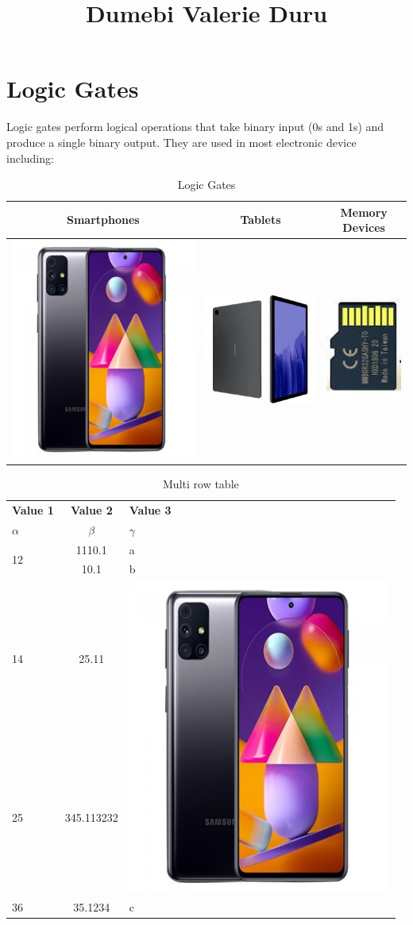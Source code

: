 \documentclass{article}
\begin{document}
		\title{Dumebi Valerie Duru}
		\maketitle
	\section{Logic Gates}
			Logic gates perform logical operations that take binary input (0s and 1s) and produce a single binary output. They are used in most electronic device including:
			\cite{hall2019opportunity}

	\begin{table}[h!]
		\begin{center}
			\caption{Logic Gates}
			\label{tab: table 1}
			\begin{tabular}{|c|c|c|}
					\hline
					Smartphones & Tablets & Memory Devices\\
					\hline
					\includegraphics[width=0.1\linewidth]{phone.jpg} & \includegraphics[width=0.1\linewidth]{tablet.jpg} & \includegraphics[width=0.1\linewidth]{memory device.jpg}\\
					\hline
			\end{tabular}
		\end{center}	
	\end{table}

	\begin{table}[h!]
		\caption{Multi row table}
		\label{tab: table 2}
		\begin{center}
		\begin{tabular}{|l|c|l|}
			\hline
			\textbf{Value 1} & \textbf{Value 2} & \textbf{Value 3}\\
			$\alpha$ & $\beta$ & $\gamma$\\ 
			\hline
			\multirow{2}{*}{12} & 1110.1 & a\\
			& 10.1 & b\\
			\hline
			14 & 25.11 & \multirow{2}{*}{\includegraphics[width=0.05\linewidth]{phone.jpg}}\\
			25 & 345.113232 & \\
			\hline
			36 & 35.1234 & c\\
			\hline
			
		\end{tabular}
		\end{center}
	\end{table}
\end{document}
